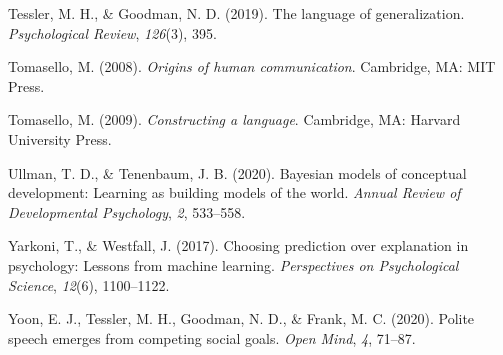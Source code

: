 \documentclass[
  man,floatsintext]{apa6}
\newlength{\cslhangindent}
\newlength{\cslentryspacingunit} %
\newenvironment{CSLReferences}[2] %
 {%
  \setlength{\parindent}{0pt}
  \ifodd #1
  \let\oldpar\par
  \def\par{\hangindent=\cslhangindent\oldpar}
  \fi
  \setlength{\parskip}{#2\cslentryspacingunit}
 }%
 {}
\begin{document}
\begin{CSLReferences}{1}{0}
\leavevmode{}%
Tessler, M. H., \& Goodman, N. D. (2019). The language of generalization. \emph{Psychological Review}, \emph{126}(3), 395.

\leavevmode{}%
Tomasello, M. (2008). \emph{Origins of human communication}. Cambridge, MA: MIT Press.

\leavevmode{}%
Tomasello, M. (2009). \emph{Constructing a language}. Cambridge, MA: Harvard University Press.

\leavevmode{}%
Ullman, T. D., \& Tenenbaum, J. B. (2020). Bayesian models of conceptual development: Learning as building models of the world. \emph{Annual Review of Developmental Psychology}, \emph{2}, 533--558.

\leavevmode{}%
Yarkoni, T., \& Westfall, J. (2017). Choosing prediction over explanation in psychology: Lessons from machine learning. \emph{Perspectives on Psychological Science}, \emph{12}(6), 1100--1122.

\leavevmode{}%
Yoon, E. J., Tessler, M. H., Goodman, N. D., \& Frank, M. C. (2020). Polite speech emerges from competing social goals. \emph{Open Mind}, \emph{4}, 71--87.

\end{CSLReferences}

\endgroup
\end{document}
